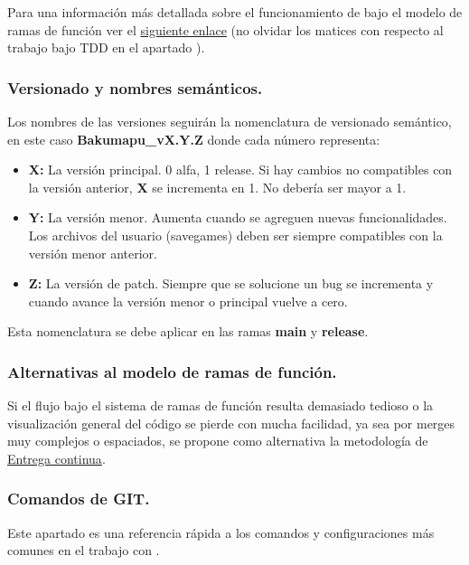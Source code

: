 Para una información más detallada sobre el funcionamiento de  bajo el modelo de ramas de función ver el \href{https://www.atlassian.com/es/git/tutorials/comparing-workflows/feature-branch-workflow}{siguiente enlace} (no olvidar los matices con respecto al trabajo bajo TDD en el apartado ).

\subsubsection{Versionado y nombres semánticos.}\label{flujo:versionado-y-nombres}
Los nombres de las versiones seguirán la nomenclatura de versionado semántico, en este caso \textbf{Bakumapu\_vX.Y.Z} donde cada número representa:
\begin{itemize}[label=-]
	\item \textbf{X:} La versión principal. 0 alfa, 1 release. Si hay cambios no compatibles con la versión anterior, \textbf{X} se incrementa en 1. No debería ser mayor a 1.
	\item \textbf{Y:} La versión menor. Aumenta cuando se agreguen nuevas funcionalidades. Los archivos del usuario (savegames) deben ser siempre compatibles con la versión menor anterior.
	\item \textbf{Z:} La versión de patch. Siempre que se solucione un bug se incrementa y cuando avance la versión menor o principal vuelve a cero.
\end{itemize}

Esta nomenclatura se debe aplicar en las ramas \textbf{main} y \textbf{release}.

\subsubsection{Alternativas al modelo de ramas de función.}\label{flujo:alternativas-al-branching}
Si el flujo bajo el sistema de ramas de función resulta demasiado tedioso o la visualización general del código se pierde con mucha facilidad, ya sea por merges muy complejos o espaciados, se propone como alternativa la metodología de \href{https://es.wikipedia.org/wiki/Entrega_continua}{Entrega continua}.

\subsubsection{Comandos de GIT.}\label{flujo:comandos-de-git}
Este apartado es una referencia rápida a los comandos y configuraciones más comunes en el trabajo con .

